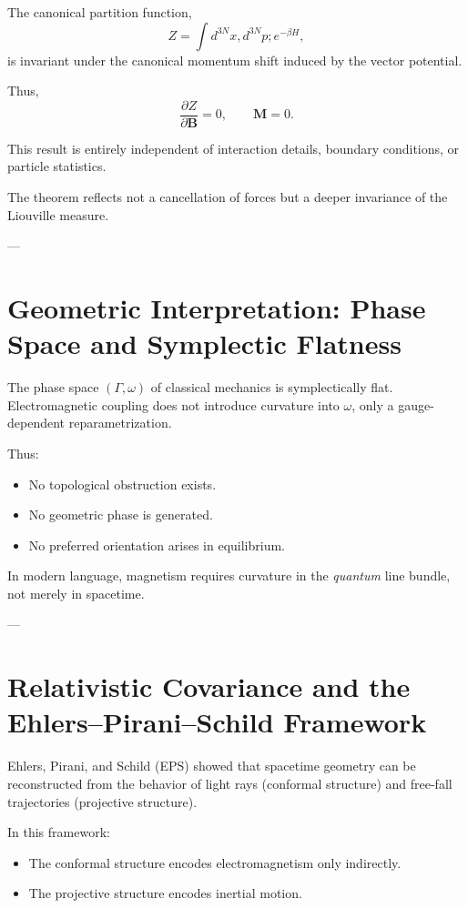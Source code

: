 \documentclass[11pt]{article}
\begin{document}
The canonical partition function,
\[
Z = \int d^{3N}x, d^{3N}p ; e^{-\beta H},
\]
is invariant under the canonical momentum shift induced by the vector potential.

Thus,
\[
\frac{\partial Z}{\partial \mathbf{B}} = 0,
\qquad
\mathbf{M} = 0.
\]

This result is entirely independent of interaction details, boundary conditions, or particle statistics.

The theorem reflects not a cancellation of forces but a deeper invariance of the Liouville measure.

---

\section{Geometric Interpretation: Phase Space and Symplectic Flatness}

The phase space $(\Gamma,\omega)$ of classical mechanics is symplectically flat. Electromagnetic coupling does not introduce curvature into $\omega$, only a gauge-dependent reparametrization.

Thus:
\begin{itemize}
\item No topological obstruction exists.
\item No geometric phase is generated.
\item No preferred orientation arises in equilibrium.
\end{itemize}

In modern language, magnetism requires curvature in the \emph{quantum} line bundle, not merely in spacetime.

---

\section{Relativistic Covariance and the Ehlers--Pirani--Schild Framework}

Ehlers, Pirani, and Schild (EPS) showed that spacetime geometry can be reconstructed from the behavior of light rays (conformal structure) and free-fall trajectories (projective structure).

In this framework:
\begin{itemize}
\item The conformal structure encodes electromagnetism only indirectly.
\item The projective structure encodes inertial motion.
\end{itemize}
\end{document}
